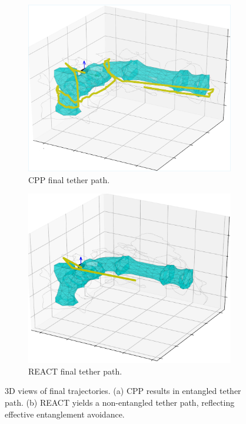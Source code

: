 \begin{figure}[ht]
    \centering
    \begin{subfigure}[b]{0.48\linewidth}
        \centering
        \includegraphics[width=\linewidth]{EA-Planner/figures/fc_planner_final_view.pdf}
        \caption{\ac{CPP} final tether path.}
        \label{fig:3d_cpp}
    \end{subfigure}
    \hfill
    \begin{subfigure}[b]{0.48\linewidth}
        \centering
        \includegraphics[width=\linewidth]{EA-Planner/figures/react_pipe.pdf}
        \caption{\ac{REACT} final tether path.}
        \label{fig:3d_oea}
    \end{subfigure}
    \caption{3D views of final trajectories. (a) CPP results in entangled tether path. (b) \ac{REACT} yields a non-entangled tether path, reflecting effective entanglement avoidance.}
    \label{fig:3Dplots}
\end{figure}
